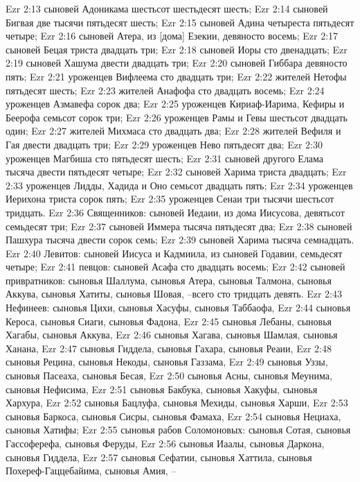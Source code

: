 Ezr 2:13  сыновей Адоникама шестьсот шестьдесят шесть;
Ezr 2:14  сыновей Бигвая две тысячи пятьдесят шесть;
Ezr 2:15  сыновей Адина четыреста пятьдесят четыре;
Ezr 2:16  сыновей Атера, из [дома] Езекии, девяносто восемь;
Ezr 2:17  сыновей Бецая триста двадцать три;
Ezr 2:18  сыновей Иоры сто двенадцать;
Ezr 2:19  сыновей Хашума двести двадцать три;
Ezr 2:20  сыновей Гиббара девяносто пять;
Ezr 2:21  уроженцев Вифлеема сто двадцать три;
Ezr 2:22  жителей Нетофы пятьдесят шесть;
Ezr 2:23  жителей Анафофа сто двадцать восемь;
Ezr 2:24  уроженцев Азмавефа сорок два;
Ezr 2:25  уроженцев Кириаф-Иарима, Кефиры и Беерофа семьсот сорок три;
Ezr 2:26  уроженцев Рамы и Гевы шестьсот двадцать один;
Ezr 2:27  жителей Михмаса сто двадцать два;
Ezr 2:28  жителей Вефиля и Гая двести двадцать три;
Ezr 2:29  уроженцев Нево пятьдесят два;
Ezr 2:30  уроженцев Магбиша сто пятьдесят шесть;
Ezr 2:31  сыновей другого Елама тысяча двести пятьдесят четыре;
Ezr 2:32  сыновей Харима триста двадцать;
Ezr 2:33  уроженцев Лидды, Хадида и Оно семьсот двадцать пять;
Ezr 2:34  уроженцев Иерихона триста сорок пять;
Ezr 2:35  уроженцев Сенаи три тысячи шестьсот тридцать.
Ezr 2:36  Священников: сыновей Иедаии, из дома Иисусова, девятьсот семьдесят три;
Ezr 2:37  сыновей Иммера тысяча пятьдесят два;
Ezr 2:38  сыновей Пашхура тысяча двести сорок семь;
Ezr 2:39  сыновей Харима тысяча семнадцать.
Ezr 2:40  Левитов: сыновей Иисуса и Кадмиила, из сыновей Годавии, семьдесят четыре;
Ezr 2:41  певцов: сыновей Асафа сто двадцать восемь;
Ezr 2:42  сыновей привратников: сыновья Шаллума, сыновья Атера, сыновья Талмона, сыновья Аккува, сыновья Хатиты, сыновья Шовая, --всего сто тридцать девять.
Ezr 2:43  Нефинеев: сыновья Цихи, сыновья Хасуфы, сыновья Таббаофа,
Ezr 2:44  сыновья Кероса, сыновья Сиаги, сыновья Фадона,
Ezr 2:45  сыновья Лебаны, сыновья Хагабы, сыновья Аккува,
Ezr 2:46  сыновья Хагава, сыновья Шамлая, сыновья Ханана,
Ezr 2:47  сыновья Гиддела, сыновья Гахара, сыновья Реаии,
Ezr 2:48  сыновья Рецина, сыновья Некоды, сыновья Газзама,
Ezr 2:49  сыновья Уззы, сыновья Пасеаха, сыновья Бесая,
Ezr 2:50  сыновья Асны, сыновья Меунима, сыновья Нефисима,
Ezr 2:51  сыновья Бакбука, сыновья Хакуфы, сыновья Хархура,
Ezr 2:52  сыновья Бацлуфа, сыновья Мехиды, сыновья Харши,
Ezr 2:53  сыновья Баркоса, сыновья Сисры, сыновья Фамаха,
Ezr 2:54  сыновья Нециаха, сыновья Хатифы;
Ezr 2:55  сыновья рабов Соломоновых: сыновья Сотая, сыновья Гассоферефа, сыновья Феруды,
Ezr 2:56  сыновья Иаалы, сыновья Даркона, сыновья Гиддела,
Ezr 2:57  сыновья Сефатии, сыновья Хаттила, сыновья Похереф-Гаццебайима, сыновья Амия, --

